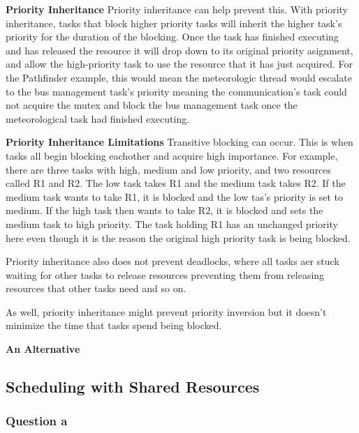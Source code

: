 \documentclass[]{report}
\begin{document}
\textbf{Priority Inheritance}
Priority inheritance can help prevent this. With priority inheritance, tasks that block higher priority tasks will inherit the higher task's priority for the duration of the blocking. Once the task has finished executing and has released the resource it will drop down to its original priority asignment, and allow the high-priority task to use the resource that it has just acquired. For the Pathfinder example, this would mean the meteorologic thread would escalate to the bus management task's priority meaning the communication's task could not acquire the mutex and block the bus management task once the meteorological task had finished executing. 

\textbf{Priority Inheritance Limitations}
Transitive blocking can occur. This is when tasks all begin blocking eachother and acquire high importance. For example, there are three tasks with high, medium and low priority, and two resources called R1 and R2. The low task takes R1 and the medium task takes R2. If the medium task wants to take R1, it is blocked and the low tas's priority is set to medium. If the high task then wants to take R2, it is blocked and sets the medium task to high priority. The task holding R1 has an unchanged priority here even though it is the reason the original high priority task is being blocked.

Priority inheritance also does not prevent deadlocks, where all tasks aer stuck waiting for other tasks to release resources preventing them from releasing resources that other tasks need and so on.

As well, priority inheritance might prevent priority inversion but it doesn't minimize the time that tasks spend being blocked.

\textbf{An Alternative}


		
		\subsection{Scheduling with Shared Resources}
			\subsubsection{Question a}
		

\end{document}
